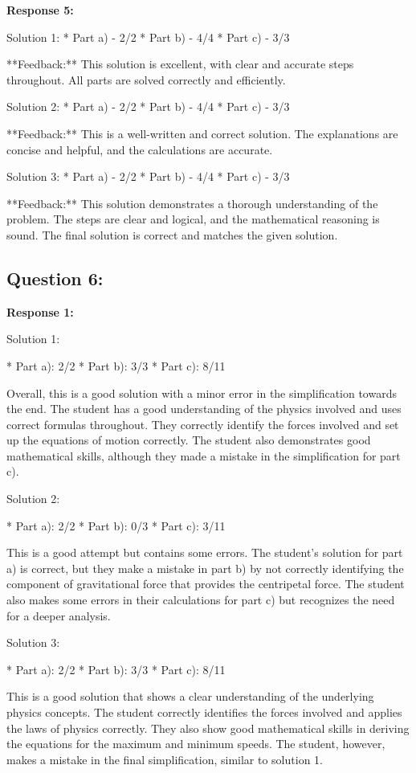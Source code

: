 \documentclass[a4paper,11pt]{article}
\begin{document}
\bigskip    
\textbf{Response 5:}

Solution 1:
*   Part a) - 2/2
*   Part b) - 4/4
*   Part c) - 3/3

**Feedback:** This solution is excellent, with clear and accurate steps throughout. All parts are solved correctly and efficiently.

Solution 2:
*   Part a) - 2/2
*   Part b) - 4/4
*   Part c) - 3/3

**Feedback:** This is a well-written and correct solution. The explanations are concise and helpful, and the calculations are accurate. 

Solution 3:
*   Part a) - 2/2
*   Part b) - 4/4
*   Part c) - 3/3

**Feedback:** This solution demonstrates a thorough understanding of the problem. The steps are clear and logical, and the mathematical reasoning is sound. The final solution is correct and matches the given solution.

\subsection*{Question 6:}

\textbf{Response 1:}

Solution 1:

* Part a): 2/2
* Part b): 3/3
* Part c): 8/11

Overall, this is a good solution with a minor error in the simplification towards the end. The student has a good understanding of the physics involved and uses correct formulas throughout. They correctly identify the forces involved and set up the equations of motion correctly. The student also demonstrates good mathematical skills, although they made a mistake in the simplification for part c).

Solution 2:

* Part a): 2/2
* Part b): 0/3
* Part c): 3/11

This is a good attempt but contains some errors. The student's solution for part a) is correct, but they make a mistake in part b) by not correctly identifying the component of gravitational force that provides the centripetal force. The student also makes some errors in their calculations for part c) but recognizes the need for a deeper analysis.

Solution 3:

* Part a): 2/2
* Part b): 3/3
* Part c): 8/11

This is a good solution that shows a clear understanding of the underlying physics concepts. The student correctly identifies the forces involved and applies the laws of physics correctly. They also show good mathematical skills in deriving the equations for the maximum and minimum speeds. The student, however, makes a mistake in the final simplification, similar to solution 1.
\end{document}
